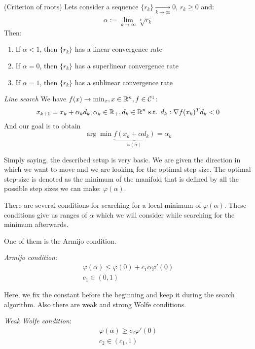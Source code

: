 \begin{theorem} (Criterion of roots) Lets consider a sequence $\{r_k\} \xrightarrow[k \to \infty]{} 0$, $r_k \geqslant 0$ and:
\begin{gather*}
  \alpha := \overline{\lim_{k \to \infty}} \sqrt[k]{r_k}
\end{gather*}
Then: 
\begin{enumerate}
  \item If $\alpha < 1$, then $\{r_k\}$ has a linear convergence rate
  \item If $\alpha = 0$, then $\{r_k\}$ has a superlinear convergence rate
  \item If $\alpha = 1$, then $\{r_k\}$ has a sublinear convergence rate
\end{enumerate}
\end{theorem}

\begin{definition} \textit{Line search} We have $f(x) \to \min_{x}, x \in \mathbb{R}^n, f \in \mathcal{C}^1$:
\begin{gather*}
  x_{k+1} = x_k + \alpha_k d_k, \alpha_k \in \mathbb{R}_+, d_k \in \mathbb{R}^n \text{ s.t. } d_k: \nabla f(x_k)^T d_k < 0
\end{gather*}
And our goal is to obtain 
$$
  \arg \min \underbrace{f(x_k + \alpha d_k)}_{\varphi(\alpha)} = \alpha_k
$$
\end{definition}

Simply saying, the described setup is very basic. We are given the direction in which we want to move and we are looking for the optimal step size. The optimal step-size is denoted as the minimum of the manifold that is defined by all the possible step sizes we can make: $\varphi(\alpha)$.

There are several conditions for searching for a local minimum of $\varphi(\alpha)$. These conditions give us ranges of $\alpha$ which we will consider while searching for the minimum afterwards.

One of them is the Armijo condition.
\begin{definition} \textit{Armijo condition}:
\begin{gather*}
  \varphi(\alpha) \leqslant \varphi(0) + c_1 \alpha \varphi'(0) \\
  c_1 \in (0, 1)
\end{gather*}
\end{definition}

Here, we fix the constant before the beginning and keep it during the search algorithm. Also there are weak and strong Wolfe conditions.
\begin{definition} \textit{Weak Wolfe condition}:
\begin{gather*}
  \varphi(\alpha) \geqslant c_2 \varphi'(0) \\
  c_2 \in (c_1, 1)
\end{gather*}
\end{definition}

